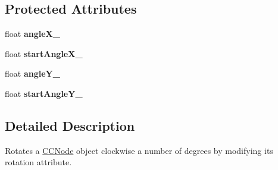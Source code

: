 \subsection*{Protected Attributes}
\begin{DoxyCompactItemize}
\item 
\hypertarget{interface_c_c_rotate_by_a050c7b043dca7e058146dfa7e44c20c7}{float {\bfseries angle\-X\-\_\-}}\label{interface_c_c_rotate_by_a050c7b043dca7e058146dfa7e44c20c7}

\item 
\hypertarget{interface_c_c_rotate_by_a4437fde1e693a5aba681a14943f4fe70}{float {\bfseries start\-Angle\-X\-\_\-}}\label{interface_c_c_rotate_by_a4437fde1e693a5aba681a14943f4fe70}

\item 
\hypertarget{interface_c_c_rotate_by_a57473460115c906c548ccec8f6ab4c02}{float {\bfseries angle\-Y\-\_\-}}\label{interface_c_c_rotate_by_a57473460115c906c548ccec8f6ab4c02}

\item 
\hypertarget{interface_c_c_rotate_by_af48b8d9c986b51c9b9eb87941fde1a0f}{float {\bfseries start\-Angle\-Y\-\_\-}}\label{interface_c_c_rotate_by_af48b8d9c986b51c9b9eb87941fde1a0f}

\end{DoxyCompactItemize}


\subsection{Detailed Description}
Rotates a \hyperlink{class_c_c_node}{C\-C\-Node} object clockwise a number of degrees by modifying its rotation attribute. 

